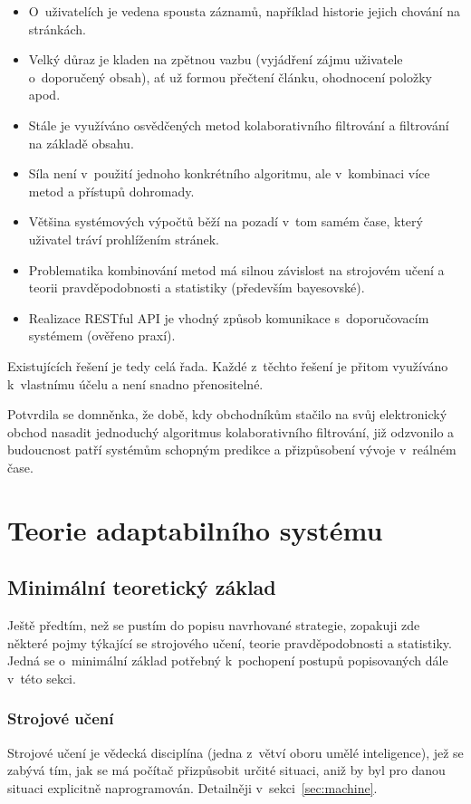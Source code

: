 \documentclass[thesis=M,czech]{FITthesis}[2014/05/07]
\begin{document}
\begin{itemize}
	\item O~uživatelích je vedena spousta záznamů, například historie jejich chování na stránkách.
	\item Velký důraz je kladen na zpětnou vazbu (vyjádření zájmu uživatele o~doporučený obsah), ať už formou přečtení článku, ohodnocení položky apod.
	\item Stále je využíváno osvědčených metod kolaborativního filtrování a filtrování na základě obsahu.
	\item Síla není v~použití jednoho konkrétního algoritmu, ale v~kombinaci více metod a přístupů dohromady.
	\item Většina systémových výpočtů běží na pozadí v~tom samém čase, který uživatel tráví prohlížením stránek.
	\item Problematika kombinování metod má silnou závislost na strojovém učení a teorii pravděpodobnosti a statistiky (především bayesovské).
	\item Realizace RESTful API je vhodný způsob komunikace s~doporučovacím systémem (ověřeno praxí).
\end{itemize}

Existujících řešení je tedy celá řada. Každé z~těchto řešení je přitom využíváno k~vlastnímu účelu a není snadno přenositelné.

Potvrdila se domněnka, že době, kdy obchodníkům stačilo na svůj elektronický obchod nasadit jednoduchý algoritmus kolaborativního filtrování, již odzvonilo a budoucnost patří systémům schopným predikce a přizpůsobení vývoje v~reálném čase. 

\section{Teorie adaptabilního systému}
\label{chap:adapt}

\subsection{Minimální teoretický základ}

Ještě předtím, než se pustím do popisu navrhované strategie, zopakuji zde některé pojmy týkající se strojového učení, teorie pravděpodobnosti a statistiky. Jedná se o~minimální základ potřebný k~pochopení postupů popisovaných dále v~této sekci. 

\subsubsection{Strojové učení}
Strojové učení je vědecká disciplína (jedna z~větví oboru umělé inteligence), jež se zabývá tím, jak se má počítač přizpůsobit určité situaci, aniž by byl pro danou situaci explicitně naprogramován. Detailněji v~sekci~\ref{sec:machine}.
\end{document}
